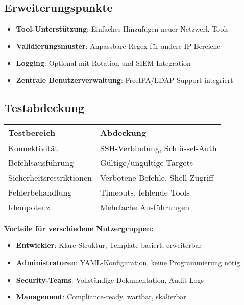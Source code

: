 \documentclass[10pt,a4paper]{article}
\begin{document}
\subsection*{Erweiterungspunkte}

\begin{itemize}    \item \textbf{Tool-Unterstützung}: Einfaches Hinzufügen neuer Netzwerk-Tools
    \item \textbf{Validierungsmuster}: Anpassbare Regex für andere IP-Bereiche  
    \item \textbf{Logging}: Optional mit Rotation und SIEM-Integration
    \item \textbf{Zentrale Benutzerverwaltung}: FreeIPA/LDAP-Support integriert
\end{itemize}

\subsection*{Testabdeckung}

\begin{center}
\begin{tabular}{|l|l|}
\hline
\textbf{Testbereich} & \textbf{Abdeckung} \\
\hline
Konnektivität & SSH-Verbindung, Schlüssel-Auth \\
Befehlsausführung & Gültige/ungültige Targets \\
Sicherheitsrestriktionen & Verbotene Befehle, Shell-Zugriff \\
Fehlerbehandlung & Timeouts, fehlende Tools \\
Idempotenz & Mehrfache Ausführungen \\
\hline
\end{tabular}
\end{center}

\textbf{Vorteile für verschiedene Nutzergruppen:}
\begin{itemize}    \item \textbf{Entwickler}: Klare Struktur, Template-basiert, erweiterbar
    \item \textbf{Administratoren}: YAML-Konfiguration, keine Programmierung nötig
    \item \textbf{Security-Teams}: Vollständige Dokumentation, Audit-Logs
    \item \textbf{Management}: Compliance-ready, wartbar, skalierbar
\end{itemize}

\newpage
\end{document}
